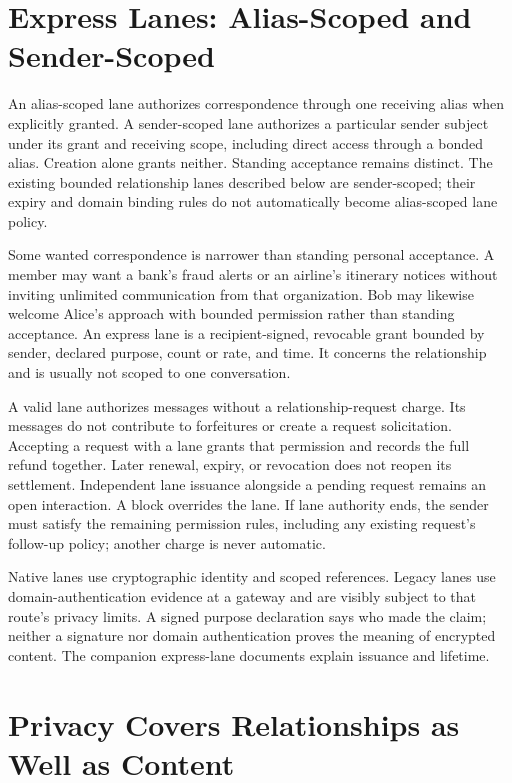 \documentclass[11pt]{article}
\begin{document}
\section{Express Lanes: Alias-Scoped and Sender-Scoped}

An alias-scoped lane authorizes correspondence through one receiving alias
when explicitly granted. A sender-scoped lane authorizes a particular sender
subject under its grant and receiving scope, including direct access through a
bonded alias. Creation alone grants neither. Standing acceptance
remains distinct. The existing bounded
relationship lanes described below are sender-scoped; their expiry and domain
binding rules do not automatically become alias-scoped lane policy.

Some wanted correspondence is narrower than standing personal acceptance. A
member may want a bank's fraud alerts or an airline's itinerary notices without
inviting unlimited communication from that organization. Bob may likewise welcome
Alice's approach with bounded permission rather than standing acceptance. An express lane is a
recipient-signed, revocable grant bounded by sender, declared purpose, count or
rate, and time. It concerns the relationship and is usually not scoped to one
conversation.

A valid lane authorizes messages without a relationship-request charge. Its
messages do not contribute to forfeitures or create a request solicitation.
Accepting a request with a lane grants that permission and records the full refund
together. Later renewal, expiry, or revocation does not reopen its settlement.
Independent lane issuance alongside a pending request remains an open interaction.
A block overrides the lane. If lane authority ends, the sender must satisfy the
remaining permission rules, including any existing request's follow-up policy;
another charge is never automatic.

Native lanes use cryptographic identity and scoped references. Legacy lanes use
domain-authentication evidence at a gateway and are visibly subject to that
route's privacy limits. A signed purpose declaration says who made the claim;
neither a signature nor domain authentication proves the meaning of encrypted
content. The companion express-lane documents explain issuance and lifetime.

\section{Privacy Covers Relationships as Well as Content}
\end{document}
